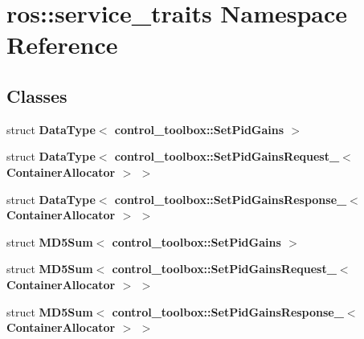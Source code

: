 \section{ros\-:\-:service\-\_\-traits \-Namespace \-Reference}
\label{namespaceros_1_1service__traits}
\subsection*{\-Classes}
\begin{DoxyCompactItemize}
\item 
struct {\bf \-Data\-Type$<$ control\-\_\-toolbox\-::\-Set\-Pid\-Gains $>$}
\item 
struct {\bf \-Data\-Type$<$ control\-\_\-toolbox\-::\-Set\-Pid\-Gains\-Request\-\_\-$<$ Container\-Allocator $>$ $>$}
\item 
struct {\bf \-Data\-Type$<$ control\-\_\-toolbox\-::\-Set\-Pid\-Gains\-Response\-\_\-$<$ Container\-Allocator $>$ $>$}
\item 
struct {\bf \-M\-D5\-Sum$<$ control\-\_\-toolbox\-::\-Set\-Pid\-Gains $>$}
\item 
struct {\bf \-M\-D5\-Sum$<$ control\-\_\-toolbox\-::\-Set\-Pid\-Gains\-Request\-\_\-$<$ Container\-Allocator $>$ $>$}
\item 
struct {\bf \-M\-D5\-Sum$<$ control\-\_\-toolbox\-::\-Set\-Pid\-Gains\-Response\-\_\-$<$ Container\-Allocator $>$ $>$}
\end{DoxyCompactItemize}
